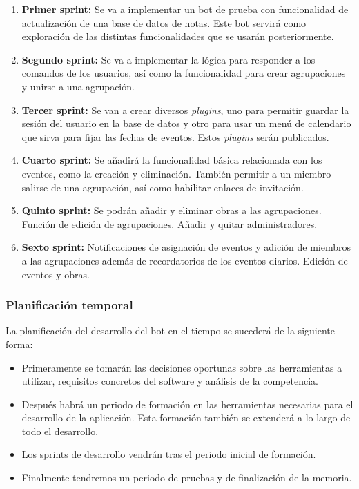\begin{enumerate}

\item \textbf{Primer sprint:} Se va a implementar un bot de prueba con funcionalidad de actualización de una base de datos de notas. Este bot servirá como exploración de las distintas funcionalidades que se usarán posteriormente.
\item \textbf{Segundo sprint:} Se va a implementar la lógica para responder a los comandos de los usuarios, así como la funcionalidad para crear agrupaciones y unirse a una agrupación.
\item \textbf{Tercer sprint:} Se van a crear diversos \textit{plugins}, uno para permitir guardar la sesión del usuario en la base de datos y otro para usar un menú de calendario que sirva para fijar las fechas de eventos. Estos \textit{plugins} serán publicados.
\item \textbf{Cuarto sprint:} Se añadirá la funcionalidad básica relacionada con los eventos, como la creación y eliminación. También permitir a un miembro salirse de una agrupación, así como habilitar enlaces de invitación.
\item \textbf{Quinto sprint:} Se podrán añadir y eliminar obras a las agrupaciones. Función de edición de agrupaciones. Añadir y quitar administradores.
\item \textbf{Sexto sprint:} Notificaciones de asignación de eventos y adición de miembros a las agrupaciones además de recordatorios de los eventos diarios. Edición de eventos y obras.
\end{enumerate}

\subsubsection{Planificación temporal}

La planificación del desarrollo del bot en el tiempo se sucederá de la siguiente forma:

\begin{itemize}
    \item Primeramente se tomarán las decisiones oportunas sobre las herramientas a utilizar, requisitos concretos del software y análisis de la competencia.
    \item Después habrá un periodo de formación en las herramientas necesarias para el desarrollo de la aplicación. Esta formación también se extenderá a lo largo de todo el desarrollo.
    \item Los sprints de desarrollo vendrán tras el periodo inicial de formación.
    \item Finalmente tendremos un periodo de pruebas y de finalización de la memoria.
\end{itemize}

